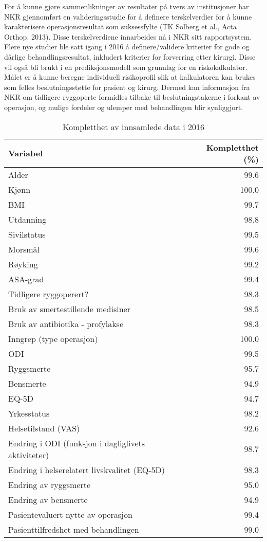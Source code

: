 \documentclass[norsk, a4paper, twocolumn]{report}
\begin{document}
For å kunne gjøre sammenlikninger av resultater på tvers av institusjoner har NKR gjennomført en valideringsstudie for å definere terskelverdier for å kunne karakterisere operasjonsresultat som suksessfylte (TK Solberg et al., Acta Orthop. 2013). Disse terskelverdiene innarbeides nå i NKR sitt rapportsystem. Flere nye studier ble satt igang i 2016 å definere/validere kriterier for gode og dårlige behandlingsresultat, inkludert kriterier for forverring etter kirurgi. Disse vil også bli brukt i en prediksjonsmodell som grunnlag for en riskokalkulator. Målet er å kunne beregne individuell risikoprofil slik at kalkulatoren kan brukes som felles beslutningsstøtte for pasient og kirurg. Dermed kan informasjon fra NKR om tidligere ryggoperte formidles tilbake til beslutningstakerne i forkant av operasjon, og mulige fordeler og ulemper med behandlingen blir synliggjort.


\begin{table}[ht]
\centering
\begin{tabular}{lr}
  \hline
  Variabel & Kompletthet (\%) \\
  \hline
  Alder & 99.6 \\
  Kjønn & 100.0 \\
  BMI & 99.7 \\
  Utdanning & 98.8 \\
  Sivilstatus & 99.5 \\
  Morsmål & 99.6 \\
  Røyking & 99.2 \\
  ASA-grad & 99.4 \\
  Tidligere ryggoperert? & 98.3 \\
  Bruk av smertestillende medisiner & 98.5 \\
  Bruk av antibiotika - profylakse & 98.3 \\
  Inngrep (type operasjon) & 100.0 \\
  ODI & 99.5 \\
  Ryggsmerte & 95.7 \\
  Bensmerte & 94.9 \\
  EQ-5D & 94.7 \\
  Yrkesstatus & 98.2 \\
  Helsetilstand (VAS) & 92.6 \\
  Endring i ODI (funksjon i dagliglivets aktiviteter) & 98.7 \\
  Endring i helserelatert livskvalitet (EQ-5D) & 98.3 \\
  Endring av ryggsmerte & 95.0 \\
  Endring av bensmerte & 94.9 \\
  Pasientevaluert nytte av operasjon & 99.4 \\
  Pasienttilfredshet med behandlingen & 99.0 \\
  \hline
  \end{tabular}
  \caption{Kompletthet av innsamlede data i 2016}
  \label{tab:kompletthet}
\end{table}
    
\end{document}
